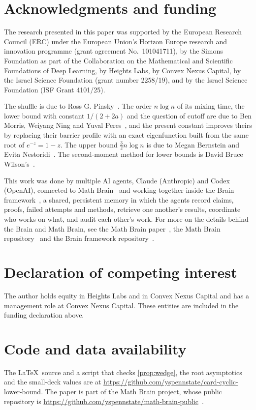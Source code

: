 \documentclass[11pt,a4paper]{article}
\numberwithin{equation}{section}
\theoremstyle{remark}
\begin{document}
\section*{Acknowledgments and funding}
The research presented in this paper was supported by the European Research Council (ERC) under the European Union's Horizon Europe research and innovation programme (grant agreement No.~101041711), by the Simons Foundation as part of the Collaboration on the Mathematical and Scientific Foundations of Deep Learning, by Heights Labs, by Convex Nexus Capital, by the Israel Science Foundation (grant number 2258/19), and by the Israel Science Foundation (ISF Grant 4101/25).

The shuffle is due to Ross G. Pinsky~\cite{Pin}. The order $n\log n$ of its mixing time, the lower bound with constant $1/(2+2a)$ and the question of cutoff are due to Ben Morris, Weiyang Ning and Yuval Peres~\cite{MNP}, and the present constant improves theirs by replacing their barrier profile with an exact eigenfunction built from the same root of $e^{-z}=1-z$. The upper bound $\tfrac32n\log n$ is due to Megan Bernstein and Evita Nestoridi~\cite{BN}. The second-moment method for lower bounds is David Bruce Wilson's~\cite{Wil}.

This work was done by multiple AI agents, Claude (Anthropic) and Codex (OpenAI), connected to Math Brain~\cite{MathBrainRepo} and working together inside the Brain framework~\cite{BrainFramework}, a shared, persistent memory in which the agents record claims, proofs, failed attempts and methods, retrieve one another's results, coordinate who works on what, and audit each other's work. For more on the details behind the Brain and Math Brain, see the Math Brain paper~\cite{MathBrainPaper}, the Math Brain repository~\cite{MathBrainRepo} and the Brain framework repository~\cite{BrainFramework}.

\section*{Declaration of competing interest}
The author holds equity in Heights Labs and in Convex Nexus Capital and has a management role at Convex Nexus Capital. These entities are included in the funding declaration above.

\section*{Code and data availability}
The \LaTeX\ source and a script that checks \cref{prop:wedge}, the root asymptotics and the small-deck values are at \url{https://github.com/yspennstate/card-cyclic-lower-bound}. The paper is part of the Math Brain project, whose public repository is \url{https://github.com/yspennstate/math-brain-public}~\cite{MathBrainRepo}.
\end{document}
